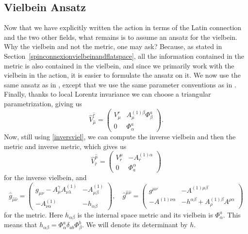 \documentclass{article}
\begin{document}
\subsection{Vielbein Ansatz} \label{part:vielbeinanstaz}
Now that we have explicitly written the action in terms of the Latin connection and the two other fields, what remains is to assume an ansatz for the vielbein. Why the vielbein and not the metric, one may ask? Because, as stated in Section~\ref{spinconnexionvielbeinandflatspace},
all the information contained in the metric is also contained in the vielbein, and since we primarily work with the vielbein in the action, it is easier to formulate the ansatz on it. We now use the same ansatz as in \cite{scherk1979get},
except that we use the same parameter conventions as in \cite{maharana1993noncompact}. Finally, thanks to local Lorentz invariance we can choose a triangular parametrization, giving us
\begin{equation} \label{vielbeinanstaz}
    \boxed{\hat V^{\hat r}_{\hat \mu} =\begin{pmatrix}
    V^{r}_{\mu} & A^{(1)\beta }_{\mu} \Phi^{a}_{\beta} \\ 0 & \Phi^{a}_\alpha
    \end{pmatrix}. }
\end{equation}
Now, still using \eqref{inversviel}, we can compute the inverse vielbein and then the metric and inverse metric, which gives us
\begin{equation} \label{expinverseviel}
    \hat V^{\hat \mu}_{\hat r} = \begin{pmatrix} 
         V^\mu_r &  - A^{(1)\alpha }_r \\ 0 & \Phi^\alpha_a
    \end{pmatrix}
\end{equation}
for the inverse vielbein, and
\begin{equation} \label{expmetric}
    \hat g_{\hat \mu \hat \nu} = \begin{pmatrix}
        g_{\mu \nu} - A^{\gamma}_{\mu}A^{(1)}_{\nu \lambda} & - A^{(1)}_{\mu \beta} \\  -A^{(1)}_{\nu \alpha} &-h_{\alpha \beta}
    \end{pmatrix}, \quad
    \hat g^{\hat \mu \hat \nu} = \begin{pmatrix}
        g^{\mu \nu}  & - A^{ (1)\mu \beta} \\ - A^{(1)\nu \alpha} &-h^{\alpha \beta}+ A^{(1)\beta}_{\rho}A^{\rho \alpha}
    \end{pmatrix}
\end{equation}
for the metric. Here $h_{\alpha \beta}$ is the internal space metric and its vielbein is $\Phi^a_\alpha$. This means that $h_{\alpha \beta} = \Phi^a_\alpha \delta_{a b } \Phi^b_\beta $. We will denote its determinant by $h$.
\end{document}
